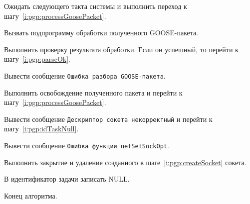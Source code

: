 \begin{enumerate_step}
    \item Ожидать следующего такта системы и выполнить переход к шагу~\ref{i:pgp:processGoosePacket}.
    \item \label{i:pgp:netRecvNcOk} Вызвать подпрограмму обработки полученного GOOSE-пакета.
    \item Выполнить проверку результата обработки. Если он успешный, то перейти к шагу~\ref{i:pgp:parseOk}.
    \item Вывести сообщение \texttt{Ошибка разбора GOOSE-пакета}.
    \item \label{i:pgp:parseOk} Выполнить освобождение полученного пакета и перейти к шагу~\ref{i:pgp:processGoosePacket}.

    \item \label{i:pgp:socketHandleInvalid} Вывести сообщение \texttt{Дескриптор сокета некорректный} и перейти к шагу~\ref{i:pgp:idTaskNull}.
    \item \label{i:pgp:netSetSockOptError} Вывести сообщение \texttt{Ошибка функции netSetSockOpt}.
    \item \label{i:pgp:socketclose} Выполнить закрытие и удаление созданного в шаге~\ref{i:pgp:createSocket} сокета.

    \item \label{i:pgp:idTaskNull} В идентификатор задачи записать NULL.
    \item \label{i:pgp:end} Конец алгоритма.
\end{enumerate_step}
